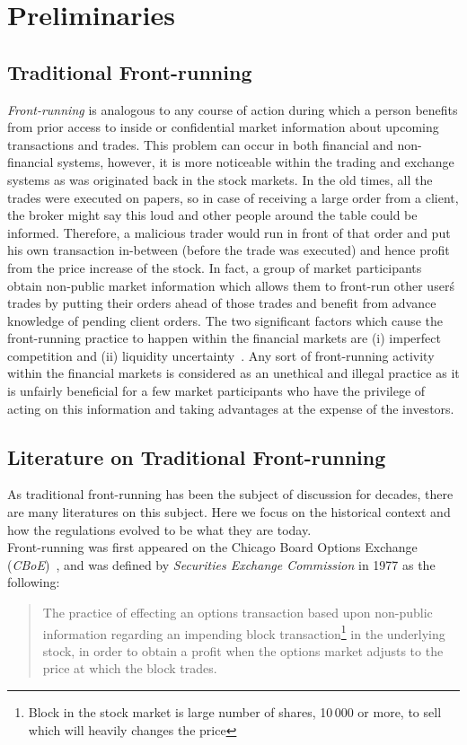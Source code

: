\section{Preliminaries}

\subsection{Traditional Front-running} 
\label{sec:What is front-running?}

\emph{Front-running} is analogous to any course of action during which a person benefits from prior access to inside or confidential market information about upcoming transactions and trades. This problem can occur in both financial and non-financial systems, however, it is more noticeable within the trading and exchange systems as was originated back in the stock markets. In the old times, all the trades were executed on papers, so in case of receiving a large order from a client, the broker might say this loud and other people around the table could be informed. Therefore, a malicious trader would run in front of that order and put his own transaction in-between (before the trade was executed) and hence profit from the price increase of the stock. In fact, a group of market participants obtain non-public market information which allows them to front-run other user\'s trades by putting their orders ahead of those trades and benefit from advance knowledge of pending client orders. The two significant factors which cause the front-running practice to happen within the financial markets are (i) imperfect competition and (ii) liquidity uncertainty~\cite{liang2005distressed}. Any sort of front-running activity within the financial markets is considered as an unethical and illegal practice as it is unfairly beneficial for a few market participants who have the privilege of acting on this information and taking advantages at the expense of the investors. 

\subsection{Literature on Traditional Front-running}\label{traditionalFrontrunning}
As traditional front-running has been the subject of discussion for decades, there are many literatures on this subject. Here we focus on the historical context and how the regulations evolved to be what they are today.\\
Front-running was first appeared on the Chicago Board Options Exchange (\textit{CBoE})~\cite{markham1988front}, and was defined by \textit{Securities Exchange Commission} in 1977 as the following:
\begin{quote}
The practice of effecting an options transaction based upon non-public information regarding an impending block transaction\footnote{Block in the stock market is large number of shares, 10\,000 or more, to sell which will heavily changes the price} in the underlying stock, in order to obtain a profit when the options market adjusts to the price at which the block trades. ~\cite{sec1978optionsmarket}
\end{quote} 

